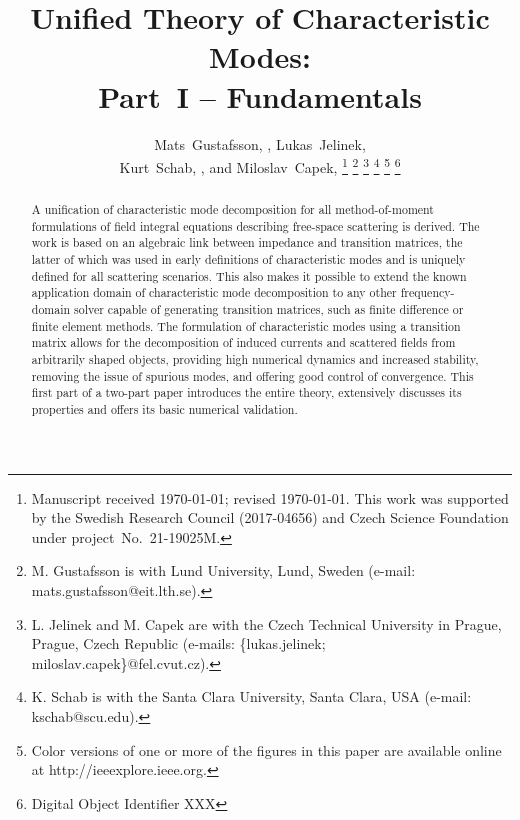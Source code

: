 \documentclass[journal]{IEEEtran}
\begin{document}
\title{Unified Theory of Characteristic Modes:\\Part~I -- Fundamentals}
\author{Mats~Gustafsson, ,
Lukas~Jelinek, \\
Kurt~Schab, , and
Miloslav~Capek, 
\thanks{Manuscript received \today; revised \today. This work was supported by the  Swedish Research Council (2017-04656) and Czech Science Foundation under project~\mbox{No.~21-19025M}.}
\thanks{M. Gustafsson is with Lund University, Lund, Sweden (e-mail: mats.gustafsson@eit.lth.se).}
\thanks{L. Jelinek and M. Capek are with the Czech Technical University in Prague, Prague, Czech Republic (e-mails: \{lukas.jelinek; miloslav.capek\}@fel.cvut.cz).}
\thanks{K. Schab is with the Santa Clara University, Santa Clara, USA (e-mail: kschab@scu.edu).}
\thanks{Color versions of one or more of the figures in this paper are
available online at http://ieeexplore.ieee.org.}%
\thanks{Digital Object Identifier XXX}%
}

\maketitle

\begin{abstract}
A unification of characteristic mode decomposition for all method-of-moment formulations of field integral equations describing free-space scattering is derived. The work is based on an algebraic link between impedance and transition matrices, the latter of which was used in early definitions of characteristic modes and is uniquely defined for all scattering scenarios. This also makes it possible to extend the known application domain of characteristic mode decomposition to any other frequency-domain solver capable of generating transition matrices, such as finite difference or finite element methods. The formulation of characteristic modes using a transition matrix allows for the decomposition of induced currents and scattered fields from arbitrarily shaped objects, providing high numerical dynamics and increased stability, removing the issue of spurious modes, and offering good control of convergence. This first part of a two-part paper introduces the entire theory, extensively discusses its properties and offers its basic numerical validation. 
\end{abstract}
\end{document}
